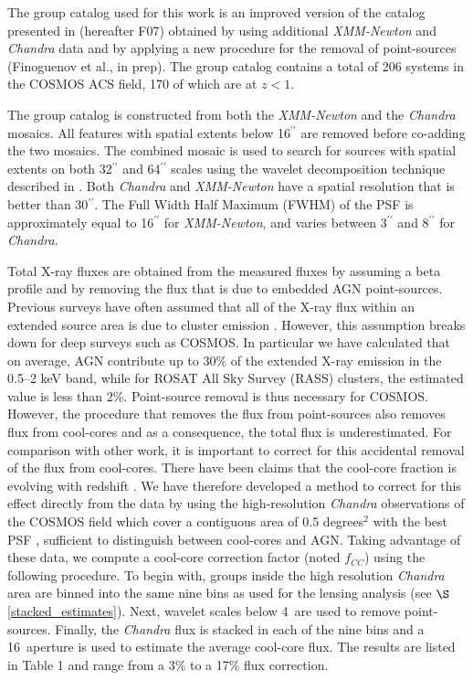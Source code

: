 \documentclass[12pt]{emulateapj}
\newcommand{\ngroup}{206 }      %
\newcommand{\ogroup}{170 }      %
\newcommand{\eg}{{\it e.g.}}
\begin{document}
The group catalog used for this work is an improved version of the
catalog presented in \citet{Finoguenov:2007} (hereafter F07) obtained
by using additional {\sl XMM-Newton} and {\sl Chandra} data and by
applying a new procedure for the removal of point-sources (Finoguenov
et al., in prep). The group catalog contains a total of \ngroup
systems in the COSMOS ACS field, \ogroup of which are at $z<1$.

The group catalog is constructed from both the {\sl XMM-Newton} and
the {\sl Chandra} mosaics. All features with spatial extents below
16$^{\prime\prime}$ are removed before co-adding the two mosaics. The
combined mosaic is used to search for sources with spatial extents on
both 32$^{\prime\prime}$ and 64$^{\prime\prime}$ scales using the
wavelet decomposition technique described in
\citet{Vikhlinin:1998}. Both {\sl Chandra} and {\sl XMM-Newton} have a
spatial resolution that is better than 30$^{\prime\prime}$. The Full
Width Half Maximum (FWHM) of the PSF is approximately equal to
16$^{\prime\prime}$ for {\sl XMM-Newton}, and varies between
3$^{\prime\prime}$ and 8$^{\prime\prime}$ for {\sl Chandra}.

Total X-ray fluxes are obtained from the measured fluxes by assuming a
beta profile and by removing the flux that is due to embedded AGN
point-sources. Previous surveys have often assumed that all of the
X-ray flux within an extended source area is due to cluster emission
\citep[\eg][]{Bohringer:2004}. However, this assumption breaks down
for deep surveys such as COSMOS. In particular we have calculated that
on average, AGN contribute up to 30\% of the extended X-ray emission
in the 0.5--2 keV band, while for ROSAT All Sky Survey (RASS)
clusters, the estimated value is less than 2\%. Point-source removal
is thus necessary for COSMOS. However, the procedure that removes the
flux from point-sources also removes flux from cool-cores and as a
consequence, the total flux is underestimated. For comparison with
other work, it is important to correct for this accidental removal of
the flux from cool-cores. There have been claims that the cool-core
fraction is evolving with redshift
\citep[][]{Jeltema:2005,Vikhlinin:2007,Maughan:2007}. We have
therefore developed a method to correct for this effect directly from
the data by using the high-resolution {\sl Chandra} observations of
the COSMOS field which cover a contiguous area of 0.5 degrees$^2$ with
the best PSF \citep[3$^{\prime\prime}$,][]{Elvis:2009}, sufficient to
distinguish between cool-cores and AGN. Taking advantage of these
data, we compute a cool-core correction factor (noted $f_{CC}$) using
the following procedure. To begin with, groups inside the high
resolution {\sl Chandra} area are binned into the same nine bins as
used for the lensing analysis (see $\S$\ref{stacked_estimates}). Next,
wavelet scales below 4\arcsec\ are used to remove
point-sources. Finally, the {\sl Chandra} flux is stacked in each of
the nine bins and a 16\arcsec\ aperture is used to estimate the
average cool-core flux. The results are listed in Table 1 and range
from a 3\% to a 17\% flux correction.
\end{document}
